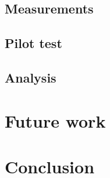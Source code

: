 \documentclass[conference]{IEEEtran}
\begin{document}
\subsection{Measurements}
\label{sec:measurements}


\subsection{Pilot test}
\label{sec:pilot_test}

\subsection{Analysis}
\label{sec:analysis}


\section{Future work}


\section{Conclusion}




\vspace{12pt}
\end{document}
